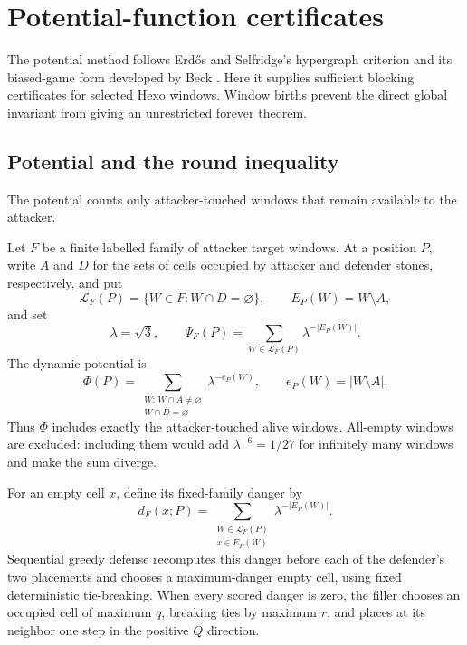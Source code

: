 \section{Potential-function certificates}
\label{sec:potential}

The potential method follows Erd\H{o}s and Selfridge's hypergraph criterion
and its biased-game form developed by Beck \cite{erdos-selfridge-1973,beck-2008}.
Here it supplies sufficient blocking certificates for selected Hexo windows.
Window births prevent the direct global invariant from giving an unrestricted
forever theorem.

\subsection{Potential and the round inequality}

The potential counts only attacker-touched windows that remain available to
the attacker.

\begin{definition}
\label{def:ES-D3}
Let $F$ be a finite labelled family of attacker target windows.  At a position
$P$, write $A$ and $D$ for the sets of cells occupied by attacker and defender
stones, respectively, and put
\[
  \mathcal L_F(P)=\{W\in F:W\cap D=\varnothing\},
  \qquad E_P(W)=W\setminus A,
\]
and set
\[
  \lambda=\sqrt3,
  \qquad
  \Psi_F(P)=\sum_{W\in\mathcal L_F(P)}\lambda^{-|E_P(W)|}.
\]
The dynamic potential is
\[
  \Phi(P)=
  \sum_{\substack{W:\,W\cap A\ne\varnothing\\W\cap D=\varnothing}}
       \lambda^{-e_P(W)},
  \qquad e_P(W)=|W\setminus A|.
\]
Thus $\Phi$ includes exactly the attacker-touched alive windows.  All-empty
windows are excluded: including them would add $\lambda^{-6}=1/27$ for
infinitely many windows and make the sum diverge.

For an empty cell $x$, define its fixed-family danger by
\[
  d_F(x;P)=
  \sum_{\substack{W\in\mathcal L_F(P)\\x\in E_P(W)}}
       \lambda^{-|E_P(W)|}.
\]
Sequential greedy defense recomputes this danger before each of the defender's
two placements and chooses a maximum-danger empty cell, using fixed
deterministic tie-breaking.  When every scored danger is zero, the filler
chooses an occupied cell of maximum $q$, breaking ties by maximum $r$, and
places at its neighbor one step in the positive $Q$ direction.
\end{definition}

